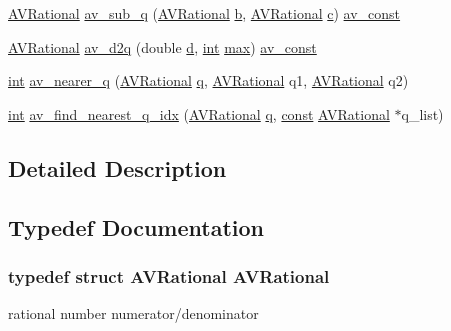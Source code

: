 \begin{DoxyCompactItemize}
\item 
\hyperlink{struct_a_v_rational}{A\+V\+Rational} \hyperlink{group__lavu__math_gac66c6198ce5e8a8caf88dfc20782fa59}{av\+\_\+sub\+\_\+q} (\hyperlink{struct_a_v_rational}{A\+V\+Rational} \hyperlink{convtest_8m_a21ad0bd836b90d08f4cf640b4c298e7c}{b}, \hyperlink{struct_a_v_rational}{A\+V\+Rational} \hyperlink{rfft2d_test_m_l_8m_ae0323a9039add2978bf5b49550572c7c}{c}) \hyperlink{attributes_8h_a9eaead3cde73464fd66bab4cef9307ad}{av\+\_\+const}
\item 
\hyperlink{struct_a_v_rational}{A\+V\+Rational} \hyperlink{group__lavu__math_ga7dfd5ba1eb1edf5845ac32b338de9e76}{av\+\_\+d2q} (double \hyperlink{poly-fir_8h_a2530554172d8629149ec56816eeaa947}{d}, \hyperlink{xmltok_8h_a5a0d4a5641ce434f1d23533f2b2e6653}{int} \hyperlink{_t_d_stretch_8cpp_ac39d9cef6a5e030ba8d9e11121054268}{max}) \hyperlink{attributes_8h_a9eaead3cde73464fd66bab4cef9307ad}{av\+\_\+const}
\item 
\hyperlink{xmltok_8h_a5a0d4a5641ce434f1d23533f2b2e6653}{int} \hyperlink{group__lavu__math_ga111810c563749cd3081aaa19004f44df}{av\+\_\+nearer\+\_\+q} (\hyperlink{struct_a_v_rational}{A\+V\+Rational} \hyperlink{vqext_8h_aed566b4fd5f50587a3ee550f7cd010ae}{q}, \hyperlink{struct_a_v_rational}{A\+V\+Rational} q1, \hyperlink{struct_a_v_rational}{A\+V\+Rational} q2)
\item 
\hyperlink{xmltok_8h_a5a0d4a5641ce434f1d23533f2b2e6653}{int} \hyperlink{group__lavu__math_ga63d5ef1c2f77a5fdccb2b3a1c8cc77f5}{av\+\_\+find\+\_\+nearest\+\_\+q\+\_\+idx} (\hyperlink{struct_a_v_rational}{A\+V\+Rational} \hyperlink{vqext_8h_aed566b4fd5f50587a3ee550f7cd010ae}{q}, \hyperlink{getopt1_8c_a2c212835823e3c54a8ab6d95c652660e}{const} \hyperlink{struct_a_v_rational}{A\+V\+Rational} $\ast$q\+\_\+list)
\end{DoxyCompactItemize}


\subsection{Detailed Description}


\subsection{Typedef Documentation}
\subsubsection[{\texorpdfstring{A\+V\+Rational}{AVRational}}]{\setlength{\rightskip}{0pt plus 5cm}typedef struct {\bf A\+V\+Rational}  {\bf A\+V\+Rational}}\hypertarget{group__lavu__math_gac01954259ee41f8ac756277216ecf933}{}\label{group__lavu__math_gac01954259ee41f8ac756277216ecf933}
rational number numerator/denominator 

